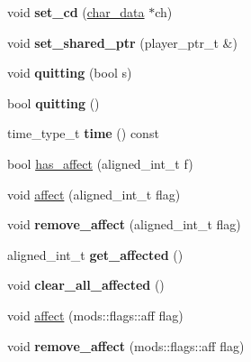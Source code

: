 \begin{DoxyCompactItemize}
void {\bfseries set\+\_\+cd} (\hyperlink{structchar__data}{char\+\_\+data} $\ast$ch)
\item 
\mbox{\label{classmods_1_1player_a6c51e26561ea4c876295da2d3702b724}} 
void {\bfseries set\+\_\+shared\+\_\+ptr} (player\+\_\+ptr\+\_\+t \&)
\item 
\mbox{\label{classmods_1_1player_a09754f81fd228f379ab56861aab2417b}} 
void {\bfseries quitting} (bool s)
\item 
\mbox{\label{classmods_1_1player_aaf94c533345266b4537d16e50ff68a38}} 
bool {\bfseries quitting} ()
\item 
\mbox{\label{classmods_1_1player_a2f6a0f9164d7b60ecb206c814c6e1f8f}} 
time\+\_\+type\+\_\+t {\bfseries time} () const
\item 
bool \hyperlink{classmods_1_1player_ae7ad590bc136eac7a54ed0071a3e882b}{has\+\_\+affect} (aligned\+\_\+int\+\_\+t f)
\item 
void \hyperlink{classmods_1_1player_a5af5ab2621df94bc867bc56ab37b0099}{affect} (aligned\+\_\+int\+\_\+t flag)
\item 
\mbox{\label{classmods_1_1player_a88ed3db5da5810c43fa3870c053ae839}} 
void {\bfseries remove\+\_\+affect} (aligned\+\_\+int\+\_\+t flag)
\item 
\mbox{\label{classmods_1_1player_ae60241b6f2ad07c7fdd4126bc66acb1a}} 
aligned\+\_\+int\+\_\+t {\bfseries get\+\_\+affected} ()
\item 
\mbox{\label{classmods_1_1player_af23a9554f115730e529655a205dbe32c}} 
void {\bfseries clear\+\_\+all\+\_\+affected} ()
\item 
void \hyperlink{classmods_1_1player_a47a34f3be04cad723e561028c7ae24cd}{affect} (mods\+::flags\+::aff flag)
\item 
\mbox{\label{classmods_1_1player_ab8f8187a386f9a9264fbea2047f15006}} 
void {\bfseries remove\+\_\+affect} (mods\+::flags\+::aff flag)
\item 
\mbox{\label{classmods_1_1player_affc66459a833b6f9f242928f0ecfcee8}} 

\end{DoxyCompactItemize}
